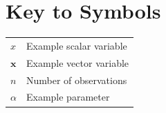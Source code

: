 \chapter*{Key to Symbols}

{
\renewcommand{\arraystretch}{1.6}
\begin{longtable}{p{3.2cm} p{11.5cm}}
\textbf{$x$} & Example scalar variable \\
\textbf{$\mathbf{x}$} & Example vector variable \\
\textbf{$n$} & Number of observations \\
\textbf{$\alpha$} & Example parameter \\
\end{longtable}
}

\cleardoublepage
